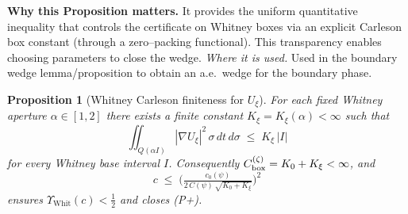 \documentclass[11pt]{article}
\newtheorem{proposition}{Proposition}[section]
\theoremstyle{definition}
\theoremstyle{remark}
\begin{document}
\vspace{1.0cm}
\noindent\textbf{Why this Proposition matters.} It provides the uniform quantitative inequality that controls the certificate on Whitney boxes via an explicit Carleson box constant (through a zero--packing functional). This transparency enables choosing parameters to close the wedge.
\noindent\textit{Where it is used.} Used in the boundary wedge lemma/proposition to obtain an a.e.\ wedge for the boundary phase.
\begin{proposition}[Whitney Carleson finiteness for $U_\xi$]\label{prop:Kxi-finite}
For each fixed Whitney aperture $\alpha\in[1,2]$ there exists a finite constant
$K_\xi=K_\xi(\alpha)<\infty$ such that
\[
  \iint_{Q(\alpha I)} |\nabla U_\xi|^2\,\sigma\,dt\,d\sigma \;\le\; K_\xi\,|I|
\]
for every Whitney base interval $I$. Consequently $C_{\rm box}^{(\zeta)}=K_0+K_\xi<\infty$, and
\[
  c \;\le\; \Big(\tfrac{c_0(\psi)}{2\,C(\psi)\,\sqrt{K_0+K_\xi}}\Big)^2
\]
ensures $\Upsilon_{\mathrm{Whit}}(c)<\tfrac12$ and closes \textup{(P+)}.
\end{proposition}
















\vspace{1.0cm}
\end{document}
